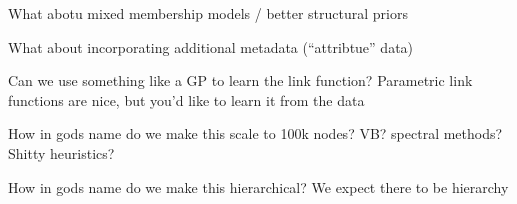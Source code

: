 \documentclass{article}
\begin{document}
What abotu mixed membership models / better structural priors

What about incorporating additional metadata (``attribtue'' data)

Can we use something like a GP to learn the link function? 
Parametric link functions are nice, but you'd like to learn it from the data

How in gods name do we make this scale to 100k nodes? 
VB? spectral methods? Shitty heuristics? 

How in gods name do we make this hierarchical? 
We expect there to be hierarchy 

\printbibliography
\end{document}
